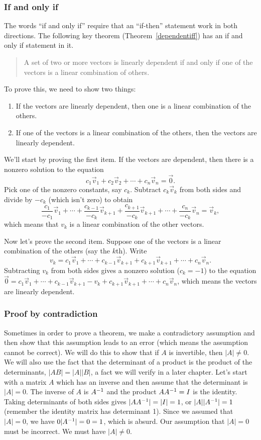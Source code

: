 \subsubsection{If and only if}
The words ``if and only if'' require that an ``if-then'' statement work in both directions.  The following key theorem (Theorem~\ref{dependentiff}) has an if and only if statement in it. 
\begin{quote}
A set of two or more vectors is linearly dependent if and only if one of the vectors is a linear combination of others.  
\end{quote}
To prove this, we need to show two things:
\begin{enumerate}
	\item If the vectors are linearly dependent, then one is a linear combination of the others.
	\item If one of the vectors is a linear combination of the others, then the vectors are linearly dependent.
\end{enumerate}
We'll start by proving the first item.  If the vectors are dependent, then there is a nonzero solution to the equation $$c_1 \vec v_1+c_2\vec v_2+\cdots+c_n\vec v_n=\vec 0.$$ Pick one of the nonzero constants, say $c_k$. Subtract $c_k\vec v_k$ from both sides and divide by $-c_k$ (which isn't zero) to obtain 
$$\frac{c_1}{-c_1}\vec v_1+\cdots+\frac{c_{k-1}}{-c_k}\vec v_{k+1}+\frac{c_{k+1}}{-c_k}\vec v_{k+1}+\cdots+\frac{c_n}{-c_k}\vec v_n=\vec v_k,$$
which means that $v_k$ is a linear combination of the other vectors.

Now let's prove the second item. Suppose one of the vectors is a linear combination of the others (say the $k$th). 
Write 
$$v_k=c_1\vec v_1+\cdots+c_{k-1}\vec v_{k+1}+c_{k+1}\vec v_{k+1}+\cdots+c_n\vec v_n.$$  
Subtracting $v_k$ from both sides gives a nonzero solution ($c_k=-1$) to the equation $\vec 0=c_1\vec v_1+\cdots+c_{k-1}\vec v_{k+1}-v_k+c_{k+1}\vec v_{k+1}+\cdots+c_n\vec v_n$, which means the vectors are linearly dependent.




\subsubsection{Proof by contradiction}
Sometimes in order to prove a theorem, we make a contradictory assumption and then show that this assumption leads to an error (which means the assumption cannot be correct).  
We will do this to show that if $A$ is invertible, then $|A|\neq 0$. 
We will also use the fact that the determinant of a product is the product of the determinants, $|AB|=|A||B|$, a fact we will verify in a later chapter. 
Let's start with a matrix $A$ which has an inverse and then assume that the determinant is $|A|=0$.  
The inverse of $A$ is $A^{-1}$ and the product $AA^{-1}=I$ is the identity. 
Taking determinants of both sides gives $|AA^{-1}|=|I|=1$, or $|A||A^{-1}|=1$ (remember the identity matrix has determinant 1).  
Since we assumed that $|A|=0$, we have $0|A^{-1}|=0=1$, which is absurd. 
Our assumption that $|A|=0$ must be incorrect. 
We must have $|A|\neq 0$.    

